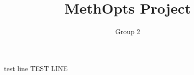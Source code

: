 \documentclass[12pt,a4paper]{article}
\author{Group 2}
\title{MethOpts Project}
\date{}
\begin{document}
\maketitle
\noindent
test line TEST LINE
\end{document}
